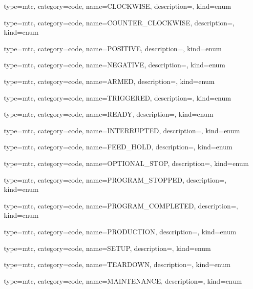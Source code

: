 {
  type=mtc,
  category=code,
  name={CLOCKWISE},
  description={},
  kind={enum}
}


{
  type=mtc,
  category=code,
  name={COUNTER\_CLOCKWISE},
  description={},
  kind={enum}
}


{
  type=mtc,
  category=code,
  name={POSITIVE},
  description={},
  kind={enum}
}


{
  type=mtc,
  category=code,
  name={NEGATIVE},
  description={},
  kind={enum}
}


{
  type=mtc,
  category=code,
  name={ARMED},
  description={},
  kind={enum}
}


{
  type=mtc,
  category=code,
  name={TRIGGERED},
  description={},
  kind={enum}
}


{
  type=mtc,
  category=code,
  name={READY},
  description={},
  kind={enum}
}


{
  type=mtc,
  category=code,
  name={INTERRUPTED},
  description={},
  kind={enum}
}


{
  type=mtc,
  category=code,
  name={FEED\_HOLD},
  description={},
  kind={enum}
}


{
  type=mtc,
  category=code,
  name={OPTIONAL\_STOP},
  description={},
  kind={enum}
}


{
  type=mtc,
  category=code,
  name={PROGRAM\_STOPPED},
  description={},
  kind={enum}
}


{
  type=mtc,
  category=code,
  name={PROGRAM\_COMPLETED},
  description={},
  kind={enum}
}


{
  type=mtc,
  category=code,
  name={PRODUCTION},
  description={},
  kind={enum}
}


{
  type=mtc,
  category=code,
  name={SETUP},
  description={},
  kind={enum}
}


{
  type=mtc,
  category=code,
  name={TEARDOWN},
  description={},
  kind={enum}
}


{
  type=mtc,
  category=code,
  name={MAINTENANCE},
  description={},
  kind={enum}
}


